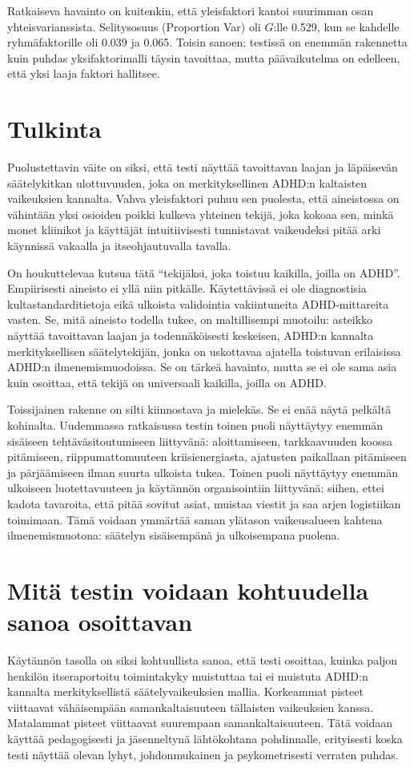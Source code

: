 \documentclass[11pt,a4paper]{article}
\begin{document}
Ratkaiseva havainto on kuitenkin, että yleisfaktori kantoi suurimman osan yhteisvarianssista. Selitysosuus (Proportion Var) oli $G$:lle 0.529, kun se kahdelle ryhmäfaktorille oli 0.039 ja 0.065. Toisin sanoen: testissä on enemmän rakennetta kuin puhdas yksifaktorimalli täysin tavoittaa, mutta päävaikutelma on edelleen, että yksi laaja faktori hallitsee.

\section{Tulkinta}
Puolustettavin väite on siksi, että testi näyttää tavoittavan laajan ja läpäisevän säätelykitkan ulottuvuuden, joka on merkityksellinen ADHD:n kaltaisten vaikeuksien kannalta. Vahva yleisfaktori puhuu sen puolesta, että aineistossa on vähintään yksi osioiden poikki kulkeva yhteinen tekijä, joka kokoaa sen, minkä monet kliinikot ja käyttäjät intuitiivisesti tunnistavat vaikeudeksi pitää arki käynnissä vakaalla ja itseohjautuvalla tavalla.

On houkuttelevaa kutsua tätä ``tekijäksi, joka toistuu kaikilla, joilla on ADHD''. Empiirisesti aineisto ei yllä niin pitkälle. Käytettävissä ei ole diagnostisia kultastandarditietoja eikä ulkoista validointia vakiintuneita ADHD-mittareita vasten. Se, mitä aineisto todella tukee, on maltillisempi muotoilu: asteikko näyttää tavoittavan laajan ja todennäköisesti keskeisen, ADHD:n kannalta merkityksellisen säätelytekijän, jonka on uskottavaa ajatella toistuvan erilaisissa ADHD:n ilmenemismuodoissa. Se on tärkeä havainto, mutta se ei ole sama asia kuin osoittaa, että tekijä on universaali kaikilla, joilla on ADHD.

Toissijainen rakenne on silti kiinnostava ja mielekäs. Se ei enää näytä pelkältä kohinalta. Uudemmassa ratkaisussa testin toinen puoli näyttäytyy enemmän sisäiseen tehtäväsitoutumiseen liittyvänä: aloittamiseen, tarkkaavuuden koossa pitämiseen, riippumattomuuteen kriisienergiasta, ajatusten paikallaan pitämiseen ja pärjäämiseen ilman suurta ulkoista tukea. Toinen puoli näyttäytyy enemmän ulkoiseen luotettavuuteen ja käytännön organisointiin liittyvänä: siihen, ettei kadota tavaroita, että pitää sovitut asiat, muistaa viestit ja saa arjen logistiikan toimimaan. Tämä voidaan ymmärtää saman ylätason vaikeusalueen kahtena ilmenemismuotona: säätelyn sisäisempänä ja ulkoisempana puolena.

\section{Mitä testin voidaan kohtuudella sanoa osoittavan}
Käytännön tasolla on siksi kohtuullista sanoa, että testi osoittaa, kuinka paljon henkilön itseraportoitu toimintakyky muistuttaa tai ei muistuta ADHD:n kannalta merkityksellistä säätelyvaikeuksien mallia. Korkeammat pisteet viittaavat vähäisempään samankaltaisuuteen tällaisten vaikeuksien kanssa. Matalammat pisteet viittaavat suurempaan samankaltaisuuteen. Tätä voidaan käyttää pedagogisesti ja jäsenneltynä lähtökohtana pohdinnalle, erityisesti koska testi näyttää olevan lyhyt, johdonmukainen ja psykometrisesti verraten puhdas.
\end{document}
